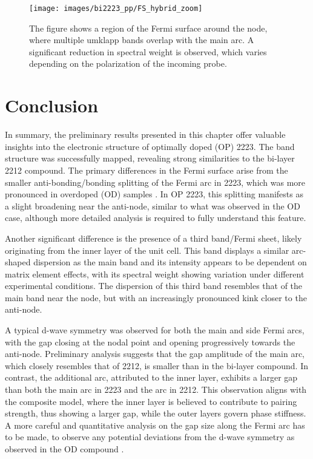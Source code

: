 \begin{figure}[h!]
	\centering
	\texttt{[image: images/bi2223\_pp/FS\_hybrid\_zoom]}
	\caption{The figure shows a region of the Fermi surface around the node, where multiple umklapp bands overlap with the main arc. A significant reduction in spectral weight is observed, which varies depending on the polarization of the incoming probe.}
	\label{fig:fs_hybrid}
\end{figure}

\section{Conclusion}

In summary, the preliminary results presented in this chapter offer valuable insights into the electronic structure of optimally doped (OP) 2223.
The band structure was successfully mapped, revealing strong similarities to the bi-layer 2212 compound.
The primary differences in the Fermi surface arise from the smaller anti-bonding/bonding splitting of the Fermi arc in 2223, which was more pronounced in overdoped (OD) samples \cite{luo_electronic_2023}.
In OP 2223, this splitting manifests as a slight broadening near the anti-node, similar to what was observed in the OD case, although more detailed analysis is required to fully understand this feature.

Another significant difference is the presence of a third band/Fermi sheet, likely originating from the inner  layer of the unit cell.
This band displays a similar arc-shaped dispersion as the main band and its intensity appears to be dependent on matrix element effects, with its spectral weight showing variation under different experimental conditions.
The dispersion of this third band resembles that of the main band near the node, but with an increasingly pronounced kink closer to the anti-node.

A typical d-wave symmetry was observed for both the main and side Fermi arcs, with the gap closing at the nodal point and opening progressively towards the anti-node.
Preliminary analysis suggests that the gap amplitude of the main arc, which closely resembles that of 2212, is smaller than in the bi-layer compound.
In contrast, the additional arc, attributed to the inner  layer, exhibits a larger gap than both the main arc in 2223 and the arc in 2212.
This observation aligns with the composite model, where the inner layer is believed to contribute to pairing strength, thus showing a larger gap, while the outer layers govern phase stiffness.
A more careful and quantitative analysis on the gap size along the Fermi arc has to be made, to observe any potential deviations from the d-wave symmetry as observed in the OD compound \cite{luo_electronic_2023}.

